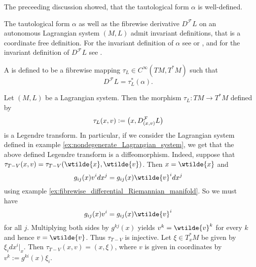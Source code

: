 \begin{remark}
	The preceeding discussion showed, that the tautological form $\alpha$ is well-defined.
\end{remark}

\begin{remark}
	The tautological form $\alpha$ as well as the fibrewise derivative $D^\mathcal{F}L$ on an autonomous Lagrangian system $(M,L)$ admit invariant definitions, that is a coordinate free definition. For the invariant definition of $\alpha$ see \cite[569]{lee:smooth_manifolds:2013} or \cite[10--11]{silva:SG:2008}, and for the invariant definition of $D^\mathcal{F}L$ see \cite[31]{takhtajan:QM:2008}. 
\end{remark}

\begin{definition}
	A  is defined to be a fibrewise mapping $\tau_L \in C^\infty(TM,T^*M)$ such that
	\begin{equation*}
		D^\mathcal{F}L = \tau_L^*(\alpha).
	\end{equation*}
\end{definition}

\begin{example}
	\label{ex:Legendre_transform_Riemannian_manifold}
	Let $(M,L)$ be a Lagrangian system. Then the morphism $\tau_L : TM \to T^*M$ defined by
	\begin{equation*}
		\tau_L(x,v) := \del[1]{x,D^\mathcal{F}_{(x,v)}L}
	\end{equation*}
	\noindent is a Legendre transform. In particular, if we consider the Lagrangian system defined in example \ref{ex:nondegenerate_Lagrangian_system}, we get that the above defined Legendre transform is a diffeomorphism. Indeed, suppose that $\tau_{T - V}(x,v) = \tau_{T - V}(\wtilde{x},\wtilde{v})$. Then $x = \wtilde{x}$ and
	\begin{equation*}
		g_{ij}(x)v^idx^j = g_{ij}(x)\wtilde{v}^idx^j	
	\end{equation*}
	\noindent using example \ref{ex:fibrewise_differential_Riemannian_manifold}. So we must have
	\begin{equation*}
		g_{ij}(x)v^i = g_{ij}(x)\wtilde{v}^i
	\end{equation*}
	\noindent for all $j$. Multiplying both sides by $g^{kj}(x)$ yields $v^k = \wtilde{v}^k$ for every $k$ and hence $v = \wtilde{v}$. Thus $\tau_{T - V}$ is injective. Let $\xi \in T^*_xM$ be given by $\xi_i dx^i\vert_x$. Then $\tau_{T - V}(x,v) = (x,\xi)$, where $v$ is given in coordinates by $v^k := g^{ki}(x)\xi_i$.
\end{example} 

